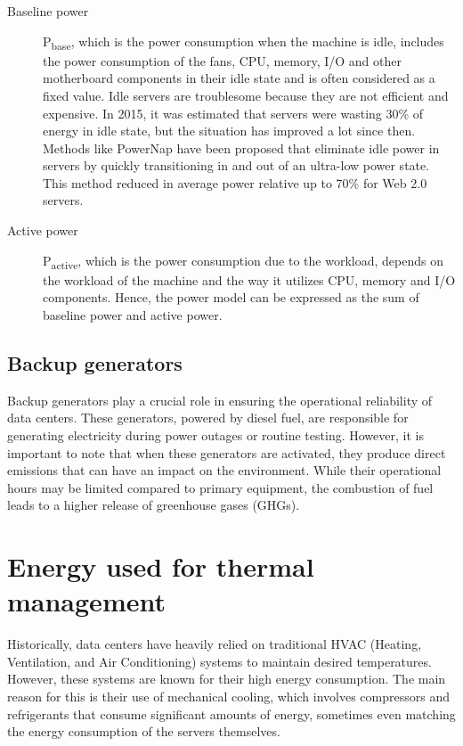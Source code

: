 \documentclass[
  a4paper,  %
  twoside,  %
  bibliography=totoc,
  headsepline,
  cleardoublepage=empty,
  parskip=half,
  draft=false
]{scrbook}
\begin{document}
\begin{description}
	\item[Baseline power] P\textsubscript{base}, which is the power consumption when the machine is idle, includes the power consumption of the fans, CPU, memory, I/O and other motherboard components in their idle state and is often considered as a fixed value. Idle servers are troublesome because they are not efficient and expensive\cite{raritanIdleServer}. In 2015, it was estimated that servers were wasting 30\% of energy in idle state, but the situation has improved a lot since then\cite{computerweeklyWasteEnergy}\cite{basmadjian2012modelling}. Methods like PowerNap have been proposed\cite{powernap_server} that eliminate idle power in servers by quickly transitioning in and out of an ultra-low power state. This method reduced in average power relative up to 70\% for Web 2.0 servers.
	
	\item[Active power] P\textsubscript{active}, which is the power consumption due to the workload, depends on the workload of the machine and the way it utilizes CPU, memory and I/O components. Hence, the power model can be expressed as the sum of baseline power and active power\cite{JIN2020114806}. 
\end{description}


\subsection{Backup generators}
Backup generators play a crucial role in ensuring the operational reliability of data centers. These generators, powered by diesel fuel, are responsible for generating electricity during power outages or routine testing. However, it is important to note that when these generators are activated, they produce direct emissions that can have an impact on the environment. While their operational hours may be limited compared to primary equipment, the combustion of fuel leads to a higher release of greenhouse gases (GHGs)\cite{jiang2015energy}.

\section{Energy used for thermal management}

Historically, data centers have heavily relied on traditional HVAC (Heating, Ventilation, and Air Conditioning) systems to maintain desired temperatures. However, these systems are known for their high energy consumption. The main reason for this is their use of mechanical cooling, which involves compressors and refrigerants that consume significant amounts of energy, sometimes even matching the energy consumption of the servers themselves\cite{bhatia2015hvac}.
\end{document}
